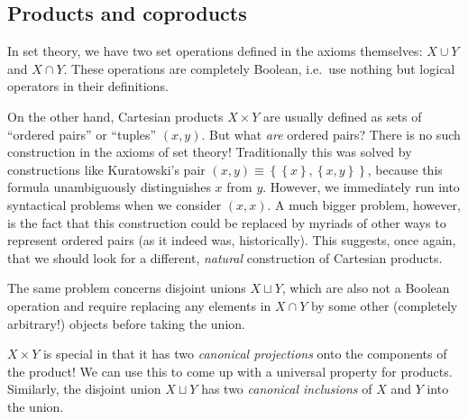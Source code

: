 \documentclass[english,letterpaper]{article}%
\numberwithin{equation}{section}
\numberwithin{figure}{section}
\numberwithin{table}{section}
\theoremstyle{definition}
\theoremstyle{definition}
\theoremstyle{definition}
\theoremstyle{plain}
\theoremstyle{plain}
\theoremstyle{plain}
\theoremstyle{plain}
\theoremstyle{remark}
\theoremstyle{remark}
\begin{document}
\subsection{Products and coproducts \label{Sec.Products}}

In set theory, we have two set operations defined in the axioms themselves:
$X\cup Y$ and $X\cap Y$. These operations are completely Boolean,
i.e.\ use nothing but logical operators in their definitions. 

On the other hand, Cartesian products $X\times Y$ are usually defined
as sets of ``ordered pairs'' or ``tuples'' $(x,y)$. But what
\emph{are} ordered pairs? There is no such construction in the axioms of
set theory! Traditionally this was solved by constructions like Kuratowski's
pair $\left(x,y\right)\equiv\left\{ \left\{ x\right\} ,\left\{ x,y\right\} \right\} $,
because this formula unambiguously distinguishes $x$ from $y$. However,
we immediately run into syntactical problems when we consider $\left(x,x\right)$.
A much bigger problem, however, is the fact that this construction
could be replaced by myriads of other ways to represent ordered pairs
(as it indeed was, historically). This suggests, once again, that
we should look for a different, \emph{natural} construction of Cartesian
products.

The same problem concerns disjoint unions $X\sqcup Y$, which are
also not a Boolean operation and require replacing any elements in
$X\cap Y$ by some other (completely arbitrary!) objects before taking
the union.

$X\times Y$ is special in that it has two \emph{canonical projections}
onto the components of the product! We can use this to come up with
a universal property for products. Similarly, the disjoint union $X\sqcup Y$
has two \emph{canonical inclusions} of $X$ and $Y$ into the union.
\end{document}
